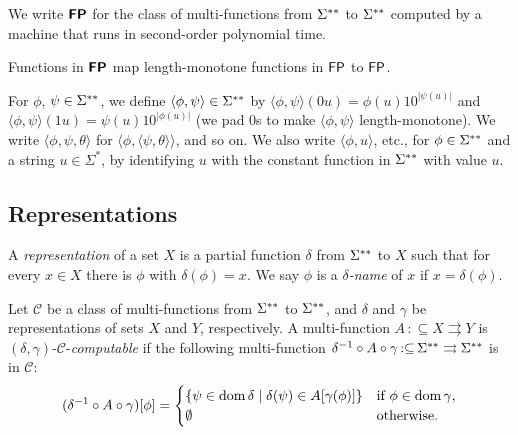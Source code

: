 \documentclass[envcountsame,orivec,oribibl]{llncs}
\newcommand{\pcolon}{\mathpunct{\,:\subseteq}}
\begin{document}
\begin{definition}
 We write $\text{\bfseries \sffamily \upshape FP}$ for the class of
 multi-functions from $\Sigma ^{**}$ to $\Sigma ^{**}$ 
 computed by a machine that runs
 in second-order polynomial time.
\end{definition}

\begin{lemma}
\label{label: classFPtwo maps classFP to classFP}
 Functions in $\text{\bfseries \sffamily \upshape FP}$ map 
 length-monotone functions in $\mathsf{FP}$ to $\mathsf{FP}$.
\end{lemma}

For $\phi$, $\psi \in \Sigma ^{**}$, 
we define $\langle \phi, \psi \rangle \in \Sigma ^{**}$ by 
$\langle \phi, \psi \rangle(0u) = \phi(u) 10^{|\psi(u)|}$ and 
$\langle \phi, \psi \rangle(1u) = \psi(u) 10^{|\phi(u)|}$
(we pad $0$s to make $\langle \phi, \psi \rangle$ length-monotone).
We write $\langle \phi, \psi, \theta \rangle$ 
for $\langle \phi, \langle \psi, \theta \rangle \rangle$, and so on.
We also write $\langle \phi, u \rangle$, etc., for 
$\phi \in \Sigma ^{**}$ and a string $u \in \Sigma ^*$, 
by identifying $u$ with the constant function in $\Sigma ^{**}$ with value $u$. 

\subsection{Representations}
\label{subsection: representations}

A {\em representation} of a set $X$ 
is a partial function $\delta$ from $\Sigma ^{**}$ to $X$
such that for every $x \in X$ there is $\phi$ with $\delta (\phi) = x$.
We say $\phi$ is a {\em $\delta$-name} of $x$
if $x = \delta(\phi)$.

Let $\mathcal C$ be a class of multi-functions from $\Sigma ^{**}$ to $\Sigma ^{**}$,
and $\delta$ and $\gamma$ be representations of sets $X$ and $Y$, respectively.
A multi-function $A \pcolon X \rightrightarrows Y$
is $(\delta, \gamma)$-$\mathcal C$-\emph{computable} if 
the following multi-function $\delta^{-1} \circ A \circ \gamma \pcolon \LM \rightrightarrows \LM$ is in $\mathcal C$: 
\begin{equation}
 (\delta^{-1} \circ A \circ \gamma)[\phi] = 
  \begin{cases}
   \{\psi \in \mathop{\rm dom} \delta \mid \delta(\psi) \in A[\gamma(\phi)] \}
   & 
   \text{if } \phi \in \mathop{\rm dom} \gamma, 
   \\ 
   \emptyset 
   &
   \text{otherwise.}
  \end{cases}
\end{equation}
\end{document}
